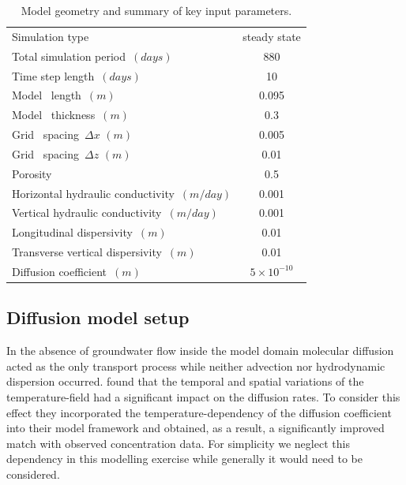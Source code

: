 \begin{table}[t]
\caption{Model geometry and summary of key input parameters.}
\begin{center}
\begin{tabular}{lc} 
\toprule
Simulation type                     & steady state \\
Total simulation period\ $ (days)      $         &  880            \\
Time step length\ $ (days)      $         &  10            \\
Model \  length\ $ (m)      $         &  0.095            \\
Model \  thickness\ $(m)$                        &  0.3            \\
Grid \ spacing\ $\Delta x $ $(m)$                &    0.005            \\
Grid \ spacing\ $\Delta z $ $(m)$                &    0.01            \\
Porosity\     $            $         &  0.5           \\
Horizontal hydraulic conductivity\ $(m/day)$               &  0.001        \\ 
Vertical   hydraulic conductivity\ $(m/day)$               &  0.001         \\ 
Longitudinal dispersivity\ $(m)                 $         &  0.01          \\ 
Transverse  vertical dispersivity\ $(m)         $         &  0.01          \\ 
Diffusion coefficient\ $(m)         $         &  $5 \times 10^{-10}$          \\ 
\bottomrule
\end{tabular}
\label{wallis_setup}
\end{center}
\end{table}
    
\subsection[Diffusion model setup]{Diffusion model setup}

In the absence of groundwater flow inside the model domain molecular 
diffusion acted as the only transport process while neither advection 
nor hydrodynamic dispersion occurred. \cite{wallis_2016} found that the
temporal and spatial variations of the temperature-field 
had a significant impact on the diffusion rates.
To consider this effect they incorporated the temperature-dependency
of the diffusion coefficient into their model framework and obtained, 
as a result, a significantly improved match with
observed concentration data. For simplicity we neglect this dependency in this 
modelling exercise while generally it would need to be considered.     
 
